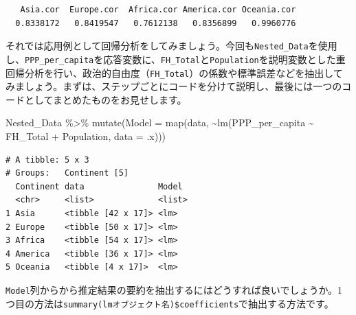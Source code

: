 \documentclass[
  a4paper,
  pandoc,
  ja=standard,
  jafont=haranoaji]{bxjsbook}
\newenvironment{Shaded}{\begin{snugshade}}{\end{snugshade}}
\newcommand{\AttributeTok}[1]{\textcolor[rgb]{0.00,0.48,0.65}{#1}}
\newcommand{\FunctionTok}[1]{\textcolor[rgb]{0.28,0.35,0.67}{#1}}
\newcommand{\NormalTok}[1]{\textcolor[rgb]{0.00,0.48,0.65}{#1}}
\newcommand{\OtherTok}[1]{\textcolor[rgb]{0.00,0.48,0.65}{#1}}
\newcommand{\SpecialCharTok}[1]{\textcolor[rgb]{0.37,0.37,0.37}{#1}}
\begin{document}
\begin{verbatim}
   Asia.cor  Europe.cor  Africa.cor America.cor Oceania.cor 
  0.8338172   0.8419547   0.7612138   0.8356899   0.9960776 
\end{verbatim}

それでは応用例として回帰分析をしてみましょう。今回も\texttt{Nested\_Data}を使用し、\texttt{PPP\_per\_capita}を応答変数に、\texttt{FH\_Total}と\texttt{Population}を説明変数とした重回帰分析を行い、政治的自由度（\texttt{FH\_Total}）の係数や標準誤差などを抽出してみましょう。まずは、ステップごとにコードを分けて説明し、最後には一つのコードとしてまとめたものをお見せします。

\begin{Shaded}
\begin{Highlighting}[numbers=left,,]
\NormalTok{Nested\_Data }\SpecialCharTok{\%\textgreater{}\%}
  \FunctionTok{mutate}\NormalTok{(}\AttributeTok{Model =} \FunctionTok{map}\NormalTok{(data, }
                     \SpecialCharTok{\textasciitilde{}}\FunctionTok{lm}\NormalTok{(PPP\_per\_capita }\SpecialCharTok{\textasciitilde{}}\NormalTok{ FH\_Total }\SpecialCharTok{+}\NormalTok{ Population, }
                         \AttributeTok{data =}\NormalTok{ .x)))}
\end{Highlighting}
\end{Shaded}

\begin{verbatim}
# A tibble: 5 x 3
# Groups:   Continent [5]
  Continent data               Model 
  <chr>     <list>             <list>
1 Asia      <tibble [42 x 17]> <lm>  
2 Europe    <tibble [50 x 17]> <lm>  
3 Africa    <tibble [54 x 17]> <lm>  
4 America   <tibble [36 x 17]> <lm>  
5 Oceania   <tibble [4 x 17]>  <lm>  
\end{verbatim}

\texttt{Model}列からから推定結果の要約を抽出するにはどうすれば良いでしょうか。1つ目の方法は\texttt{summary(lmオブジェクト名)\$coefficients}で抽出する方法です。

\begin{Shaded}
\end{Shaded}
\end{document}
